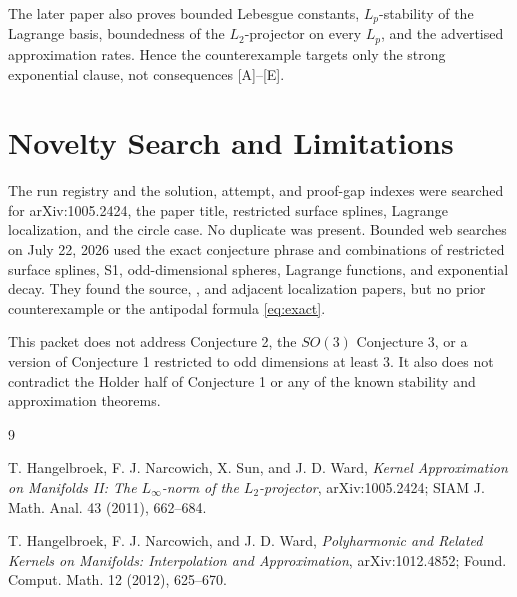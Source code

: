 \documentclass[11pt]{article}
\begin{document}
The later paper also proves bounded Lebesgue constants, \(L_p\)-stability of
the Lagrange basis, boundedness of the \(L_2\)-projector on every \(L_p\), and
the advertised approximation rates. Hence the counterexample targets only the
strong exponential clause, not consequences [A]--[E].

\section*{Novelty Search and Limitations}

The run registry and the solution, attempt, and proof-gap indexes were searched
for arXiv:1005.2424, the paper title, restricted surface splines, Lagrange
localization, and the circle case. No duplicate was present. Bounded web
searches on July 22, 2026 used the exact conjecture phrase and combinations of
restricted surface splines, S1, odd-dimensional spheres, Lagrange functions,
and exponential decay. They found the source, \cite{HNWlater}, and adjacent
localization papers, but no prior counterexample or the antipodal formula
\eqref{eq:exact}.

This packet does not address Conjecture 2, the \(SO(3)\) Conjecture 3, or a
version of Conjecture 1 restricted to odd dimensions at least \(3\). It also
does not contradict the Holder half of Conjecture 1 or any of the known
stability and approximation theorems.

\begin{thebibliography}{9}

T. Hangelbroek, F. J. Narcowich, X. Sun, and J. D. Ward,
\emph{Kernel Approximation on Manifolds II: The \(L_\infty\)-norm of the
\(L_2\)-projector}, arXiv:1005.2424; SIAM J. Math. Anal. 43 (2011),
662--684.

T. Hangelbroek, F. J. Narcowich, and J. D. Ward,
\emph{Polyharmonic and Related Kernels on Manifolds: Interpolation and
Approximation}, arXiv:1012.4852; Found. Comput. Math. 12 (2012), 625--670.

\end{thebibliography}
\end{document}
